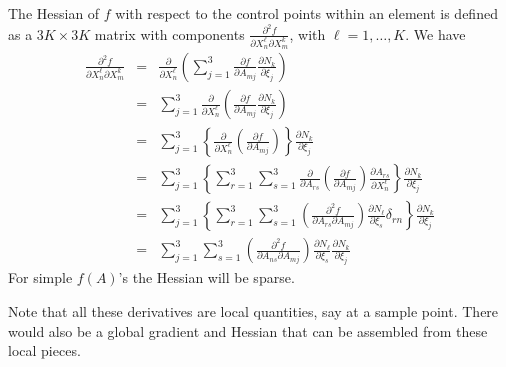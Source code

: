  \newline
The Hessian of $f$ with respect to the control points within an element is 
defined as a $3K \times 3K$ matrix with components $\frac{\partial^2 f}{\partial X_n^\ell \partial X_m^k}$, with $\ell=1,\ldots,K$.  We have
\begin{eqnarray}
\frac{\partial^2 f}{\partial X_n^\ell \partial X_m^k} & = & \frac{\partial}{\partial X_n^\ell} \left( \sum_{j=1}^3 \frac{\partial f}{\partial A_{mj}} \frac{\partial N_k}{\partial \xi_j} \right) \\
& = & \sum_{j=1}^3  \frac{\partial}{\partial X_n^\ell} \left( \frac{\partial f}{\partial A_{mj}} \frac{\partial N_k}{\partial \xi_j} \right) \\
& = & \sum_{j=1}^3  \left\{ \frac{\partial}{\partial X_n^\ell} \left( \frac{\partial f}{\partial A_{mj}} \right) \right\} \frac{\partial N_k}{\partial \xi_j} \\
& = & \sum_{j=1}^3  \left\{ \sum_{r=1}^3 \sum_{s=1}^3 \frac{\partial}{\partial A_{rs}} \left( \frac{\partial f}{\partial A_{mj}} \right) \frac{\partial A_{rs}}{\partial X_n^\ell} \right\} \frac{\partial N_k}{\partial \xi_j} \\
& = & \sum_{j=1}^3  \left\{ \sum_{r=1}^3 \sum_{s=1}^3 \left( \frac{\partial^2 f}{\partial A_{rs} \partial A_{mj}} \right) \frac{\partial N_\ell}{\partial \xi_s} \delta_{rn} \right\} \frac{\partial N_k}{\partial \xi_j} \\
& = & \sum_{j=1}^3  \sum_{s=1}^3 \left( \frac{\partial^2 f}{\partial A_{ns} \partial A_{mj}} \right) \frac{\partial N_\ell}{\partial \xi_s} \frac{\partial N_k}{\partial \xi_j}
\end{eqnarray}
For simple $f(A)$'s the Hessian will be sparse. \newline

\noindent Note that all these derivatives are local quantities, say at a sample point.  There would also be a global gradient and Hessian that can be assembled from these local pieces. \newline

